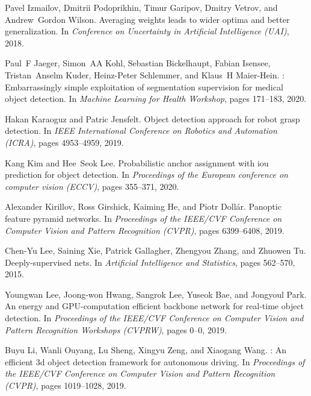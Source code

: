 \documentclass[10pt,twocolumn,letterpaper]{article}
\begin{document}
{\begin{thebibliography}{100}
				Pavel Izmailov, Dmitrii Podoprikhin, Timur Garipov, Dmitry Vetrov, and
				Andrew~Gordon Wilson.
				\newblock Averaging weights leads to wider optima and better generalization.
				\newblock In {\em Conference on Uncertainty in Artificial Intelligence (UAI)},
				2018.
				
				Paul~F Jaeger, Simon~AA Kohl, Sebastian Bickelhaupt, Fabian Isensee,
				Tristan~Anselm Kuder, Heinz-Peter Schlemmer, and Klaus~H Maier-Hein.
				: Embarrassingly simple exploitation of segmentation
				supervision for medical object detection.
				\newblock In {\em Machine Learning for Health Workshop}, pages 171--183, 2020.
				
				Hakan Karaoguz and Patric Jensfelt.
				\newblock Object detection approach for robot grasp detection.
				\newblock In {\em IEEE International Conference on Robotics and Automation
					(ICRA)}, pages 4953--4959, 2019.
				
				Kang Kim and Hee~Seok Lee.
				\newblock Probabilistic anchor assignment with iou prediction for object
				detection.
				\newblock In {\em Proceedings of the European conference on computer vision
					(ECCV)}, pages 355--371, 2020.
				
				Alexander Kirillov, Ross Girshick, Kaiming He, and Piotr Doll{\'a}r.
				\newblock Panoptic feature pyramid networks.
				\newblock In {\em Proceedings of the IEEE/CVF Conference on Computer Vision and
					Pattern Recognition (CVPR)}, pages 6399--6408, 2019.
				
				Chen-Yu Lee, Saining Xie, Patrick Gallagher, Zhengyou Zhang, and Zhuowen Tu.
				\newblock Deeply-supervised nets.
				\newblock In {\em Artificial Intelligence and Statistics}, pages 562--570,
				2015.
				
				Youngwan Lee, Joong-won Hwang, Sangrok Lee, Yuseok Bae, and Jongyoul Park.
				\newblock An energy and {GPU}-computation efficient backbone network for
				real-time object detection.
				\newblock In {\em Proceedings of the IEEE/CVF Conference on Computer Vision and
					Pattern Recognition Workshops (CVPRW)}, pages 0--0, 2019.
				
				Buyu Li, Wanli Ouyang, Lu Sheng, Xingyu Zeng, and Xiaogang Wang.
				: An efficient 3d object detection framework for autonomous
				driving.
				\newblock In {\em Proceedings of the IEEE/CVF Conference on Computer Vision and
					Pattern Recognition (CVPR)}, pages 1019--1028, 2019.
				

\end{thebibliography}}
\end{document}
